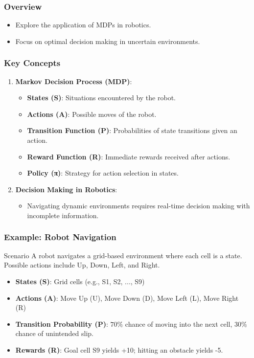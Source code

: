 \documentclass[aspectratio=169]{beamer}
\begin{document}
\begin{frame}[fragile]
    \frametitle{Overview}
    \begin{itemize}
        \item Explore the application of MDPs in robotics.
        \item Focus on optimal decision making in uncertain environments.
    \end{itemize}
\end{frame}

\begin{frame}[fragile]
    \frametitle{Key Concepts}
    \begin{enumerate}
        \item \textbf{Markov Decision Process (MDP)}:
        \begin{itemize}
            \item \textbf{States (S)}: Situations encountered by the robot.
            \item \textbf{Actions (A)}: Possible moves of the robot.
            \item \textbf{Transition Function (P)}: Probabilities of state transitions given an action.
            \item \textbf{Reward Function (R)}: Immediate rewards received after actions.
            \item \textbf{Policy (π)}: Strategy for action selection in states.
        \end{itemize}
        \item \textbf{Decision Making in Robotics}:
        \begin{itemize}
            \item Navigating dynamic environments requires real-time decision making with incomplete information.
        \end{itemize}
    \end{enumerate}
\end{frame}

\begin{frame}[fragile]
    \frametitle{Example: Robot Navigation}
    \begin{block}{Scenario}
        A robot navigates a grid-based environment where each cell is a state. Possible actions include Up, Down, Left, and Right.
    \end{block}
    \begin{itemize}
        \item \textbf{States (S)}: Grid cells (e.g., S1, S2, ..., S9)
        \item \textbf{Actions (A)}: Move Up (U), Move Down (D), Move Left (L), Move Right (R)
        \item \textbf{Transition Probability (P)}: \(70\%\) chance of moving into the next cell, \(30\%\) chance of unintended slip.
        \item \textbf{Rewards (R)}: Goal cell S9 yields +10; hitting an obstacle yields -5.
    \end{itemize}
\end{frame}
\end{document}
